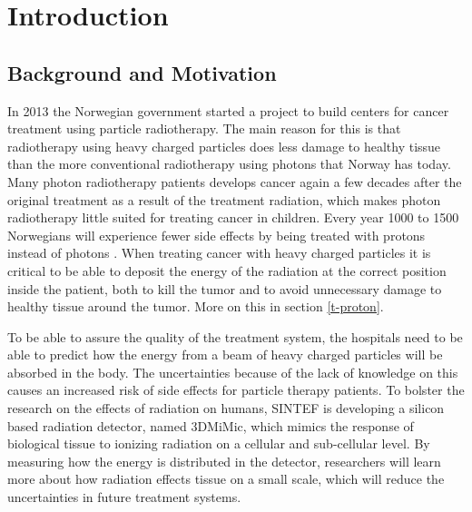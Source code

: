 \documentclass[../main/thesis.tex]{subfiles}
\begin{document}
\newpage

\chapter{Introduction}
\label{intro}
\section{Background and Motivation}
\label{i-background}
In 2013 the Norwegian government started a project to build centers for cancer treatment using particle radiotherapy. The main reason for this is that radiotherapy using heavy charged particles does less damage to healthy tissue than the more conventional radiotherapy using photons that Norway has today. Many photon radiotherapy patients develops cancer again a few decades after the original treatment as a result of the treatment radiation, which makes photon radiotherapy little suited for treating cancer in children. Every year 1000 to 1500 Norwegians will experience fewer side effects by being treated with protons instead of photons \citep{uio2012}. When treating cancer with heavy charged particles it is critical to be able to deposit the energy of the radiation at the correct position inside the patient, both to kill the tumor and to avoid unnecessary damage to healthy tissue around the tumor. More on this in section \ref{t-proton}.


To be able to assure the quality of the treatment system, the hospitals need to be able to predict how the energy from a beam of heavy charged particles will be absorbed in the body. The uncertainties because of the lack of knowledge on this causes an increased risk of side effects for particle therapy patients. To bolster the research on the effects of radiation on humans, SINTEF is developing a silicon based radiation detector, named 3DMiMic, which mimics the response of biological tissue to ionizing radiation on a cellular and sub-cellular level. By measuring how the energy is distributed in the detector, researchers will learn more about how radiation effects tissue on a small scale, which will reduce the uncertainties in future treatment systems. \citep{sintef3dmimic}
\end{document}
